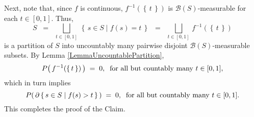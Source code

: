 	\begin{center}
	\begin{minipage}{6.5in}
	\noindent
	Next, note that, since $f$ is continuous,
	$f^{-1}\!\left(\left\{\,t\,\right\}\right)$ is $\mathcal{B}(S)$-measurable for each $t \in [0,1]$.
	Thus,
	\begin{equation*}
	S \;\; = \;\; \bigsqcup_{t \in [0,1]}\,\left\{\,s\in S \;\vert\; f(s) = t\,\right\}
	\;\; = \;\; \bigsqcup_{t \in [0,1]}\, f^{-1}\!\left(\left\{\,t\,\right\}\right)
	\end{equation*}
	is a partition of $S$ into uncountably many pairwise disjoint $\mathcal{B}(S)$-measurable subsets.
	By Lemma \ref{LemmaUncountablePartition},
	\begin{equation*}
	P\!\left(\,f^{-1}\!\left(\left\{\,t\,\right\}\right)\,\right) \; = \; 0,
	\;\;\textnormal{for all but countably many $t \in [0,1]$},
	\end{equation*}
	which in turn implies
	\begin{equation*}
	P\!\left(\,\partial\left\{\,s\in S\;\vert\;f(s) > t\,\right\}\,\right) \; = \; 0,
	\;\;\textnormal{for all but countably many $t \in [0,1]$}.
	\end{equation*}
	This completes the proof of the Claim.
	\end{minipage}
	\end{center}

